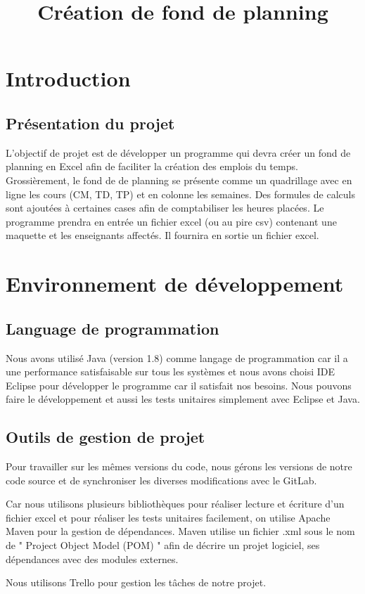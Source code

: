 \documentclass{polytech/polytech}
\title{Création de fond de planning}
\begin{document}
	\chapter{Introduction}
	\section{Présentation du projet}
	L’objectif de projet est de développer un programme qui devra créer un fond de planning en Excel afin de faciliter la création des emplois du temps. Grossièrement, le fond de de planning se présente comme un quadrillage avec en ligne les cours (CM, TD, TP) et en colonne les semaines. Des formules de calculs sont ajoutées à certaines cases afin de comptabiliser les heures placées. Le programme prendra en entrée un fichier excel (ou au pire csv) contenant une maquette et les enseignants affectés. Il fournira en sortie un fichier excel.
	\chapter{Environnement de développement}
	\section{Language de programmation}
	Nous avons utilisé Java (version 1.8) comme langage de programmation car il a une performance satisfaisable sur tous les systèmes et nous avons choisi IDE Eclipse pour développer le programme car il satisfait nos besoins. Nous pouvons faire le développement et aussi les tests unitaires simplement avec Eclipse et Java.

	\section{Outils de gestion de projet}
	Pour travailler sur les mêmes versions du code, nous gérons les versions de notre code source et de synchroniser les diverses modifications avec le GitLab.

	Car nous utilisons plusieurs bibliothèques pour réaliser lecture et écriture d'un fichier excel et pour réaliser les tests unitaires facilement, on utilise Apache Maven pour la gestion de dépendances. Maven utilise un fichier .xml sous le nom de " Project Object Model (POM) " afin de décrire un projet logiciel, ses dépendances avec des modules externes.

	Nous utilisons Trello pour gestion les tâches de notre projet.
\end{document}
